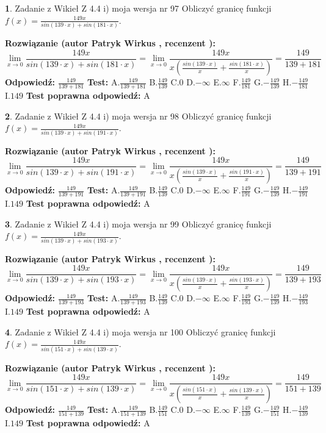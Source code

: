 \documentclass[12pt, a4paper]{article}
\theoremstyle{definition} %
\newtheorem{zad}{}
\newcommand{\zadStart}[1]{\begin{zad}#1\newline}
\newcommand{\zadStop}{\end{zad}}
\newcommand{\rozwStart}[2]{\noindent \textbf{Rozwiązanie (autor #1 , recenzent #2): }\newline}
\newcommand{\rozwStop}{\newline}
\newcommand{\odpStart}{\noindent \textbf{Odpowiedź:}\newline}
\newcommand{\odpStop}{\newline}
\newcommand{\testStart}{\noindent \textbf{Test:}\newline}
\newcommand{\testStop}{\newline}
\newcommand{\kluczStart}{\noindent \textbf{Test poprawna odpowiedź:}\newline}
\newcommand{\kluczStop}{\newline}
\begin{document}
\zadStart{Zadanie z Wikieł Z 4.4 i) moja wersja nr 97}
Obliczyć granicę funkcji $f(x)=\frac{149x}{sin(139\cdot x) +sin(181\cdot x)}$.
\zadStop
\rozwStart{Patryk Wirkus}{}
$$\lim\limits_{x\to 0}\frac{149x}{sin(139\cdot x) +sin(181\cdot x)}=\lim\limits_{x\to 0}\frac{149x}{x(\frac{sin(139\cdot x)}{x}+\frac{sin(181\cdot x)}{x})}=\frac{149}{139+181}$$
\rozwStop
\odpStart
$\frac{149}{139+181}$
\odpStop
\testStart
A.$\frac{149}{139+181}$
B.$\frac{149}{139}$
C.$0$
D.$-\infty$
E.$\infty$
F.$\frac{149}{181}$
G.$-\frac{149}{139}$
H.$-\frac{149}{181}$
I.$149$
\testStop
\kluczStart
A
\kluczStop



\zadStart{Zadanie z Wikieł Z 4.4 i) moja wersja nr 98}
Obliczyć granicę funkcji $f(x)=\frac{149x}{sin(139\cdot x) +sin(191\cdot x)}$.
\zadStop
\rozwStart{Patryk Wirkus}{}
$$\lim\limits_{x\to 0}\frac{149x}{sin(139\cdot x) +sin(191\cdot x)}=\lim\limits_{x\to 0}\frac{149x}{x(\frac{sin(139\cdot x)}{x}+\frac{sin(191\cdot x)}{x})}=\frac{149}{139+191}$$
\rozwStop
\odpStart
$\frac{149}{139+191}$
\odpStop
\testStart
A.$\frac{149}{139+191}$
B.$\frac{149}{139}$
C.$0$
D.$-\infty$
E.$\infty$
F.$\frac{149}{191}$
G.$-\frac{149}{139}$
H.$-\frac{149}{191}$
I.$149$
\testStop
\kluczStart
A
\kluczStop



\zadStart{Zadanie z Wikieł Z 4.4 i) moja wersja nr 99}
Obliczyć granicę funkcji $f(x)=\frac{149x}{sin(139\cdot x) +sin(193\cdot x)}$.
\zadStop
\rozwStart{Patryk Wirkus}{}
$$\lim\limits_{x\to 0}\frac{149x}{sin(139\cdot x) +sin(193\cdot x)}=\lim\limits_{x\to 0}\frac{149x}{x(\frac{sin(139\cdot x)}{x}+\frac{sin(193\cdot x)}{x})}=\frac{149}{139+193}$$
\rozwStop
\odpStart
$\frac{149}{139+193}$
\odpStop
\testStart
A.$\frac{149}{139+193}$
B.$\frac{149}{139}$
C.$0$
D.$-\infty$
E.$\infty$
F.$\frac{149}{193}$
G.$-\frac{149}{139}$
H.$-\frac{149}{193}$
I.$149$
\testStop
\kluczStart
A
\kluczStop



\zadStart{Zadanie z Wikieł Z 4.4 i) moja wersja nr 100}
Obliczyć granicę funkcji $f(x)=\frac{149x}{sin(151\cdot x) +sin(139\cdot x)}$.
\zadStop
\rozwStart{Patryk Wirkus}{}
$$\lim\limits_{x\to 0}\frac{149x}{sin(151\cdot x) +sin(139\cdot x)}=\lim\limits_{x\to 0}\frac{149x}{x(\frac{sin(151\cdot x)}{x}+\frac{sin(139\cdot x)}{x})}=\frac{149}{151+139}$$
\rozwStop
\odpStart
$\frac{149}{151+139}$
\odpStop
\testStart
A.$\frac{149}{151+139}$
B.$\frac{149}{151}$
C.$0$
D.$-\infty$
E.$\infty$
F.$\frac{149}{139}$
G.$-\frac{149}{151}$
H.$-\frac{149}{139}$
I.$149$
\testStop
\kluczStart
A
\kluczStop
\end{document}
